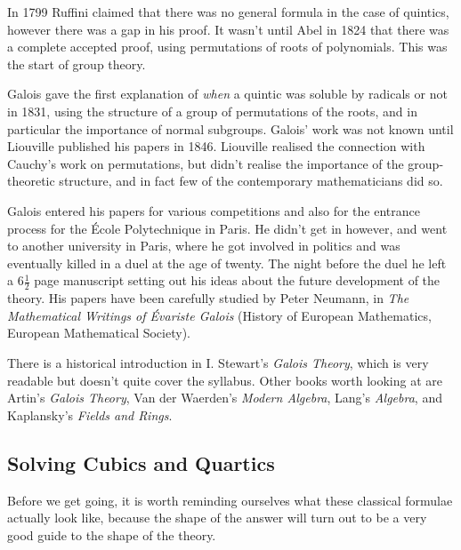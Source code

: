 \documentclass[a4paper]{scrartcl}
\begin{document}
In 1799 Ruffini claimed that there was no general formula in the case of quintics, however there was a gap in his proof. It wasn't until Abel in 1824 that there was a complete accepted proof, using permutations of roots of polynomials. This was the start of group theory.

Galois gave the first explanation of \emph{when} a quintic was soluble by radicals or not in 1831, using the structure of a group of permutations of the roots, and in particular the importance of normal subgroups. Galois' work was not known until Liouville published his papers in 1846. Liouville realised the connection with Cauchy's work on permutations, but didn't realise the importance of the group-theoretic structure, and in fact few of the contemporary mathematicians did so.

Galois entered his papers for various competitions and also for the entrance process for the \'Ecole Polytechnique in Paris. He didn't get in however, and went to another university in Paris, where he got involved in politics and was eventually killed in a duel at the age of twenty. The night before the duel he left a $6\frac{1}{2}$ page manuscript setting out his ideas about the future development of the theory. His papers have been carefully studied by Peter Neumann, in \emph{The Mathematical Writings of \'Evariste Galois} (History of European Mathematics, European Mathematical Society).

There is a historical introduction in I. Stewart's \emph{Galois Theory}, which is very readable but doesn't quite cover the syllabus. Other books worth looking at are Artin's \emph{Galois Theory}, Van der Waerden's \emph{Modern Algebra}, Lang's \emph{Algebra}, and Kaplansky's \emph{Fields and Rings}.

\subsection{Solving Cubics and Quartics}

Before we get going, it is worth reminding ourselves what these classical formulae actually look like, because the shape of the answer will turn out to be a very good guide to the shape of the theory.
\end{document}
